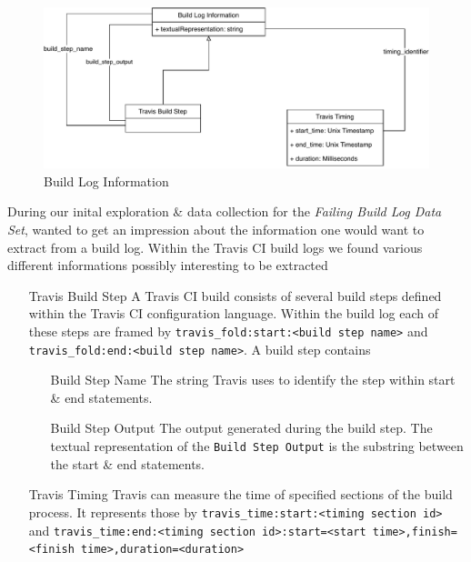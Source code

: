 \documentclass[\myrootdir/main.tex]{subfiles}
\begin{document}
\begin{figure}[h]
	\centering
	\includegraphics[width=\textwidth]{img/mt-graphics-BuildLogInformation.pdf}
	\caption{Build Log Information}
	\label{fig:build-log-information}
\end{figure}
During our inital exploration \& data collection for the \emph{Failing Build Log Data Set}, wanted to get an impression about the information one would want to extract from a build log. Within the Travis CI build logs we found various different informations possibly interesting to be extracted
\begin{itemize}
	\item[Travis Build Step] A Travis CI build consists of several build steps defined within the Travis CI configuration language. Within the build log each of these steps are framed by \lstinline{travis_fold:start:<build step name>} and \lstinline{travis_fold:end:<build step name>}.
	      A build step contains
	      \begin{itemize}
		      \item[Build Step Name] The string Travis uses to identify the step within start \& end statements.
		      \item[Build Step Output] The output generated during the build step. The textual representation of the \texttt{Build Step Output} is the substring between the start \& end statements.
	      \end{itemize}
	\item[Travis Timing] Travis can measure the time of specified sections of the build process. It represents those by \lstinline{travis_time:start:<timing section id>} and \lstinline{travis_time:end:<timing section id>:start=<start time>,finish=<finish time>,duration=<duration>}
\end{itemize}

\end{document}
